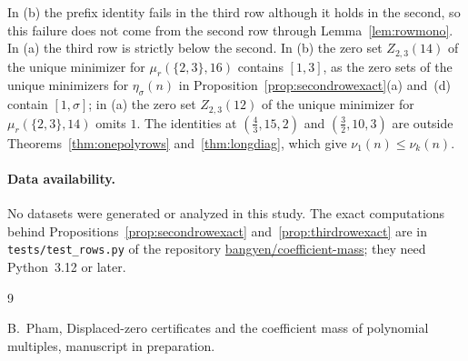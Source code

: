 \documentclass[11pt]{article}
\begin{document}
In (b) the prefix identity fails in the third row although it holds in the
second, so this failure does not come from the second row through
Lemma~\ref{lem:rowmono}.  In (a) the third row is strictly below the
second.  In (b) the zero set $Z_{2,3}(14)$ of the unique minimizer for
$\mu_r(\{2,3\},16)$ contains $[1,3]$, as the zero sets of the unique
minimizers for $\eta_\sigma(n)$ in Proposition~\ref{prop:secondrowexact}(a)
and~(d) contain $[1,\sigma]$; in (a) the zero set $Z_{2,3}(12)$ of the
unique minimizer for $\mu_r(\{2,3\},14)$ omits $1$.  The identities at
$(\frac43,15,2)$ and $(\frac32,10,3)$ are outside
Theorems~\ref{thm:onepolyrows} and~\ref{thm:longdiag}, which give
$\nu_1(n)\le\nu_k(n)$.

\paragraph{Data availability.}
No datasets were generated or analyzed in this study.  The exact
computations behind Propositions~\ref{prop:secondrowexact} and~\ref{prop:thirdrowexact} are in
\texttt{tests/test\_rows.py} of the repository
\href{https://github.com/bangyen/coefficient-mass}{bangyen/coefficient-mass};
they need Python~3.12 or later.

\begin{thebibliography}{9}

B.~Pham,
\newblock Displaced-zero certificates and the coefficient mass of polynomial
multiples,
\newblock manuscript in preparation.

\end{thebibliography}
\end{document}
